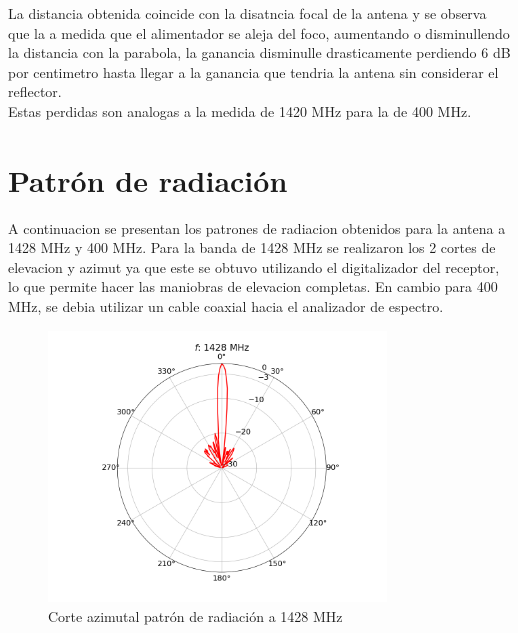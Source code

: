 La distancia obtenida coincide con la disatncia focal de la antena y se observa que la a medida que el alimentador se aleja del foco, aumentando o disminullendo la distancia con la parabola, la ganancia disminulle drasticamente perdiendo 6 dB por centimetro hasta llegar a la ganancia que tendria la antena sin considerar el reflector.\\

Estas perdidas son analogas a la medida de 1420 MHz para la de 400 MHz.\\

\section{Patrón de radiación} \label{sec:patron}

A continuacion se presentan los patrones de radiacion obtenidos para la antena a 1428 MHz y 400 MHz. Para la banda de 1428 MHz se realizaron los 2 cortes de elevacion y azimut ya que este se obtuvo utilizando el digitalizador del receptor, lo que permite hacer las maniobras de elevacion completas. En cambio para 400 MHz, se debia utilizar un cable coaxial hacia el analizador de espectro.\\





\begin{figure}
    \centering
    \includegraphics[width=0.8\textwidth]{img/1420rp}
    \caption{Corte azimutal patrón de radiación a 1428 MHz}
    \label{fig:1420rp}
\end{figure}

